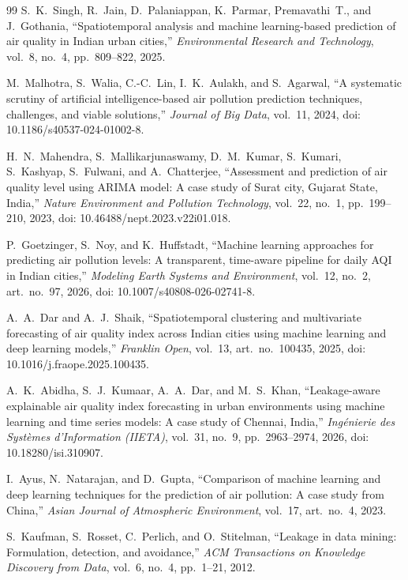 \documentclass[11pt,a4paper]{article}
\begin{document}
\begin{thebibliography}{99}
S.~K.~Singh, R.~Jain, D.~Palaniappan, K.~Parmar, Premavathi~T., and J.~Gothania, ``Spatiotemporal analysis and machine learning-based prediction of air quality in Indian urban cities,'' \emph{Environmental Research and Technology}, vol.~8, no.~4, pp.~809--822, 2025.

M.~Malhotra, S.~Walia, C.-C.~Lin, I.~K.~Aulakh, and S.~Agarwal, ``A systematic scrutiny of artificial intelligence-based air pollution prediction techniques, challenges, and viable solutions,'' \emph{Journal of Big Data}, vol.~11, 2024, doi: 10.1186/s40537-024-01002-8.

H.~N.~Mahendra, S.~Mallikarjunaswamy, D.~M.~Kumar, S.~Kumari, S.~Kashyap, S.~Fulwani, and A.~Chatterjee, ``Assessment and prediction of air quality level using ARIMA model: A case study of Surat city, Gujarat State, India,'' \emph{Nature Environment and Pollution Technology}, vol.~22, no.~1, pp.~199--210, 2023, doi: 10.46488/nept.2023.v22i01.018.

P.~Goetzinger, S.~Noy, and K.~Huffstadt, ``Machine learning approaches for predicting air pollution levels: A transparent, time-aware pipeline for daily AQI in Indian cities,'' \emph{Modeling Earth Systems and Environment}, vol.~12, no.~2, art.~no.~97, 2026, doi: 10.1007/s40808-026-02741-8.

A.~A.~Dar and A.~J.~Shaik, ``Spatiotemporal clustering and multivariate forecasting of air quality index across Indian cities using machine learning and deep learning models,'' \emph{Franklin Open}, vol.~13, art.~no.~100435, 2025, doi: 10.1016/j.fraope.2025.100435.

A.~K.~Abidha, S.~J.~Kumaar, A.~A.~Dar, and M.~S.~Khan, ``Leakage-aware explainable air quality index forecasting in urban environments using machine learning and time series models: A case study of Chennai, India,'' \emph{Ing{\'e}nierie des Syst{\`e}mes d'Information (IIETA)}, vol.~31, no.~9, pp.~2963--2974, 2026, doi: 10.18280/isi.310907.

I.~Ayus, N.~Natarajan, and D.~Gupta, ``Comparison of machine learning and deep learning techniques for the prediction of air pollution: A case study from China,'' \emph{Asian Journal of Atmospheric Environment}, vol.~17, art.~no.~4, 2023.

S.~Kaufman, S.~Rosset, C.~Perlich, and O.~Stitelman, ``Leakage in data mining: Formulation, detection, and avoidance,'' \emph{ACM Transactions on Knowledge Discovery from Data}, vol.~6, no.~4, pp.~1--21, 2012.


\end{thebibliography}
\end{document}

